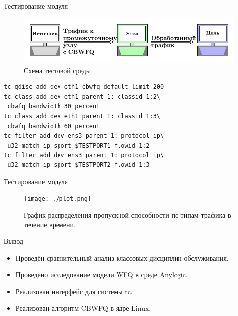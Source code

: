 \documentclass[12pt]{beamer}
\begin{document}
\begin{frame}[fragile]{Тестирование модуля}
	\begin{figure}
		\center
    	\includegraphics[scale=0.7]{../text/src/pdfimages/test_scheme.pdf}
		\caption*{{\footnotesize Схема тестовой среды}}
	\end{figure}
{\footnotesize
	\begin{lstlisting}[frame=single]
tc qdisc add dev eth1 cbwfq default limit 200
tc class add dev eth1 parent 1: classid 1:2\
 cbwfq bandwidth 30 percent  
tc class add dev eth1 parent 1: classid 1:3\
 cbwfq bandwidth 60 percent  
tc filter add dev ens3 parent 1: protocol ip\
 u32 match ip sport $TESTPORT1 flowid 1:2
tc filter add dev ens3 parent 1: protocol ip\
 u32 match ip sport $TESTPORT2 flowid 1:3
    \end{lstlisting}
}
\end{frame}

\begin{frame}{Тестирование модуля}
	\begin{figure}
		\center
    	\texttt{[image: ./plot.png]}
		\caption*{{\footnotesize График распределения пропускной способности по типам трафика в течение времени.}}
	\end{figure}
\end{frame}

\begin{frame}{Вывод}
	\begin{itemize}
		\item Проведён сравнительный анализ классовых дисциплин обслуживания.
		\item Проведено исследование модели WFQ в среде Anylogic.
		\item Реализован интерфейс для системы tc.
		\item Реализован алгоритм CBWFQ в ядре Linux.
	\end{itemize}
\end{frame}

\itmothankyou
\end{document}
